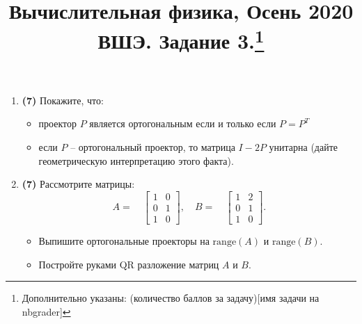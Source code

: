 \documentclass[prb,papersize=a4paper,notitlepage]{revtex4-1}%
\begin{document}
\title{Вычислительная физика, Осень 2020 ВШЭ. Задание 3.\footnote{Дополнительно указаны: (количество баллов за задачу)[имя задачи на nbgrader]}}
\maketitle


\begin{enumerate}
\item \textbf{(7)} Покажите, что:
\begin{itemize}
\item проектор $P$ является ортогональным если и только если $P = P^T$
\item если $P$ -- ортогональный проектор, то матрица $I-2P$ унитарна (дайте геометрическую интерпретацию этого факта).
\end{itemize}

\item \textbf{(7)} Рассмотрите матрицы:
$$
A=\quad\begin{bmatrix}
1 & 0\\
0 & 1\\
1 & 0
\end{bmatrix},\quad
B=\quad\begin{bmatrix}
1 & 2\\
0 & 1\\
1 & 0
\end{bmatrix}.
$$
\begin{itemize}
\item Выпишите ортогональные проекторы на $\mathrm{range}(A)$ и $\mathrm{range}(B)$.
\item Постройте руками QR разложение матриц $A$ и $B$.
\end{itemize}


\end{enumerate}
\end{document}
